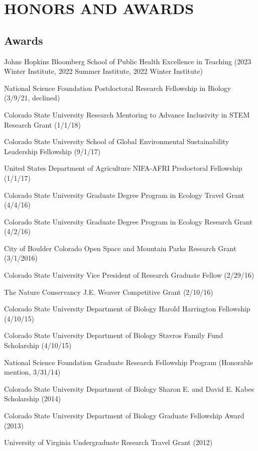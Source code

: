 \documentclass{cv}
\begin{document}
\section*{HONORS AND AWARDS}

\subsection*{Awards}

Johns Hopkins Bloomberg School of Public Health Excellence in Teaching (2023 Winter Institute, 2022 Summer Institute, 2022 Winter Institute)
	
National Science Foundation Postdoctoral Research Fellowship in Biology (3/9/21, declined) %

Colorado State University Research Mentoring to Advance Inclusivity in STEM Research Grant (1/1/18) %

Colorado State University School of Global Environmental Sustainability Leadership Fellowship (9/1/17) 

United States Department of Agriculture NIFA-AFRI Predoctoral Fellowship (1/1/17) %

Colorado State University Graduate Degree Program in Ecology Travel Grant (4/4/16) %

Colorado State University Graduate Degree Program in Ecology Research Grant (4/2/16) %

City of Boulder Colorado Open Space and Mountain Parks Research Grant (3/1/2016) %

Colorado State University Vice President of Research Graduate Fellow (2/29/16) %

The Nature Conservancy J.E. Weaver Competitive Grant (2/10/16) %

Colorado State University Department of Biology Harold Harrington Fellowship (4/10/15) %

Colorado State University Department of Biology Stavros Family Fund Scholarship (4/10/15) %

National Science Foundation Graduate Research Fellowship Program (Honorable mention, 3/31/14) 

Colorado State University Department of Biology Sharon E. and David E. Kabes Scholarship (2014) %

Colorado State University Department of Biology Graduate Fellowship Award (2013) %

University of Virginia Undergraduate Research Travel Grant (2012) %
\end{document}
